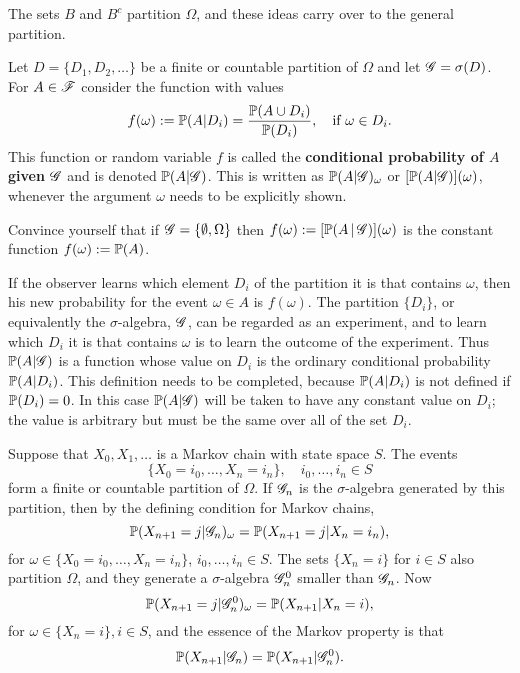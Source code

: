 The sets $B$ and $B^c$ partition $\Omega$, and these ideas carry over to the general partition. 
\begin{definition}
    Let $D = \{D_1, D_2, \dots \}$ be a finite or countable partition of $\Omega$ and let $\mathcal{G} = \sigma(D)$. For $A \in \mathcal{F}$ consider the function with values
    \begin{equation} \label{eq:conditional_probability_partition}
        f(\omega) := \mathbb{P}(A | D_i) = \frac{\mathbb{P}(A\cup D_i)}{\mathbb{P}(D_i)}, \quad \text{if }\omega \in D_i.
    \end{equation}
    This function or random variable $f$ is called the \textbf{conditional probability of $A$ given $\mathcal{G}$} and is denoted $\mathbb{P}(A | \mathcal{G})$. This is written as $\mathbb{P}(A | \mathcal{G})_\omega$ or $[\mathbb{P}(A | \mathcal{G})](\omega)$, whenever the argument $\omega$ needs to be explicitly shown.
\end{definition}

\begin{exercise}
Convince yourself that if $\mathcal{G} = \left\{ \emptyset, \Omega \right \}$ then $f(\omega) := [\mathbb{P}(A\,|\,\mathcal{G})](\omega)$ is the constant function $f(\omega) := \mathbb{P}(A)$.
\end{exercise}

If the observer learns which element $D_i$ of the partition it is that contains $\omega$, then his new probability for the event $\omega \in A$ is $f(\omega)$. The partition $\{D_i\}$, or equivalently the $\sigma$-algebra, $\mathcal{G}$, can be regarded as an experiment, and to learn which $D_i$ it is that contains $\omega$ is to learn the outcome of the experiment. Thus $\mathbb{P}(A | \mathcal{G})$ is a function whose value on $D_i$ is the ordinary conditional probability $\mathbb{P}(A | D_i)$. This definition needs to be completed, because $\mathbb{P}(A | D_i)$ is not defined if $\mathbb{P}(D_i) = 0$. In this case $\mathbb{P}(A | \mathcal{G})$ will be taken to have any constant value on $D_i$; the value is arbitrary but must be the same over all of the set $D_i$.
\begin{example}
Suppose that $X_0, X_1, \dots$ is a Markov chain with state space $S$. The events
\begin{equation*}
    \{ X_0 = i_0,\dots, X_n = i_n \}, \quad i_0,\dots, i_n \in S
\end{equation*}
form a finite or countable partition of $\Omega$. If $\mathcal{G}_n$ is the $\sigma$-algebra generated by this partition, then by the defining condition for Markov chains, 
\begin{equation*}
    \mathbb{P}(X_{n+1} = j | \mathcal{G}_n)_\omega = \mathbb{P}(X_{n+1} = j|X_n = i_n),
\end{equation*}
for $\omega \in \{ X_0 = i_0,\dots, X_n = i_n \}$, $i_0,\dots, i_n \in S$. The sets $\{X_n = i \}$ for $i\in S$ also partition $\Omega$, and they generate a $\sigma$-algebra $\mathcal{G}_n^0$ smaller than $\mathcal{G}_n$. Now 
\begin{equation*}
    \mathbb{P}(X_{n+1} = j | \mathcal{G}_n^0)_\omega = \mathbb{P}(X_{n+1} | X_n = i),
\end{equation*}
for $\omega \in \{X_n = i\}, i \in S$, and the essence of the Markov property is that 
\begin{equation*}
    \mathbb{P}(X_{n+1} | \mathcal{G}_n) = \mathbb{P}(X_{n+1}|\mathcal{G}_n^0).
\end{equation*}
\end{example} 
